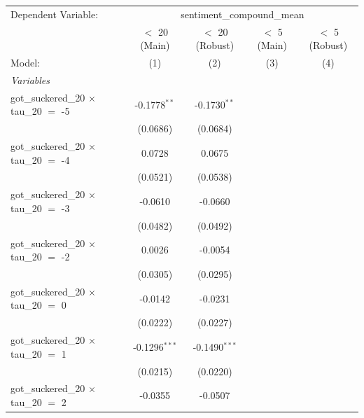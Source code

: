 
\begingroup
\centering
\begin{tabular}{lcccc}
   \tabularnewline \midrule \midrule
   Dependent Variable: & \multicolumn{4}{c}{sentiment\_compound\_mean}\\
                                                 & $<$ 20 (Main)   & $<$ 20 (Robust) & $<$ 5 (Main)          & $<$ 5 (Robust) \\   
   Model:                                        & (1)             & (2)             & (3)                   & (4)\\  
   \midrule
   \emph{Variables}\\
   got\_suckered\_20 $\times$ tau\_20 $=$ -5     & -0.1778$^{**}$  & -0.1730$^{**}$  &                       &   \\   
                                                 & (0.0686)        & (0.0684)        &                       &   \\   
   got\_suckered\_20 $\times$ tau\_20 $=$ -4     & 0.0728          & 0.0675          &                       &   \\   
                                                 & (0.0521)        & (0.0538)        &                       &   \\   
   got\_suckered\_20 $\times$ tau\_20 $=$ -3     & -0.0610         & -0.0660         &                       &   \\   
                                                 & (0.0482)        & (0.0492)        &                       &   \\   
   got\_suckered\_20 $\times$ tau\_20 $=$ -2     & 0.0026          & -0.0054         &                       &   \\   
                                                 & (0.0305)        & (0.0295)        &                       &   \\   
   got\_suckered\_20 $\times$ tau\_20 $=$ 0      & -0.0142         & -0.0231         &                       &   \\   
                                                 & (0.0222)        & (0.0227)        &                       &   \\   
   got\_suckered\_20 $\times$ tau\_20 $=$ 1      & -0.1296$^{***}$ & -0.1490$^{***}$ &                       &   \\   
                                                 & (0.0215)        & (0.0220)        &                       &   \\   
   got\_suckered\_20 $\times$ tau\_20 $=$ 2      & -0.0355         & -0.0507         &                       &   \\   

\end{tabular}
